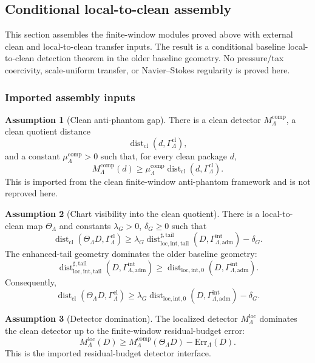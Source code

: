 \documentclass[11pt]{article}
\numberwithin{equation}{section}
\theoremstyle{definition}
\newtheorem{assumption}[assumption]{Assumption}
\theoremstyle{remark}
\newcommand{\loc}{\mathrm{loc}}
\newcommand{\intg}{\mathrm{int}}
\newcommand{\tail}{\mathrm{tail}}
\newcommand{\adm}{\mathrm{adm}}
\newcommand{\cl}{\mathrm{cl}}
\newcommand{\Dist}{\operatorname{dist}}
\newcommand{\Gammaadm}{\Gamma^{\intg}_{\Lambda,\adm}}
\begin{document}
\subsection{Conditional local-to-clean assembly}
\label{sec:conditional-assembly}

This section assembles the finite-window modules proved above with external clean and local-to-clean transfer inputs.  The result is a conditional
baseline local-to-clean detection theorem in the older baseline geometry.  No
pressure/tax coercivity, scale-uniform transfer, or Navier--Stokes regularity
is proved here.

\subsubsection{Imported assembly inputs}

\begin{assumption}[Clean anti-phantom gap]
\label{ass:clean-antiphantom-gap}
There is a clean detector \(M^{\mathrm{comp}}_\Lambda\), a clean quotient
distance
\[
    \operatorname{dist}_{\cl}(d,\Gamma^{\cl}_\Lambda),
\]
and a constant \(\mu^{\mathrm{comp}}_\Lambda>0\) such that, for every clean
package \(d\),
\[
    M^{\mathrm{comp}}_\Lambda(d)
    \ge
    \mu^{\mathrm{comp}}_\Lambda
    \operatorname{dist}_{\cl}(d,\Gamma^{\cl}_\Lambda).
\]
This is imported from the clean finite-window anti-phantom framework and is
not reproved here.
\end{assumption}

\begin{assumption}[Chart visibility into the clean quotient]
\label{ass:chart-visibility-clean}
There is a local-to-clean map \(\Theta_\Lambda\) and constants
\(\lambda_G>0\), \(\delta_G\ge0\) such that
\[
    \operatorname{dist}_{\cl}
    (\Theta_\Lambda D,\Gamma^{\cl}_\Lambda)
    \ge
    \lambda_G
    \Dist^{\sharp,\tail}_{\loc,\intg,\tail}(D,\Gammaadm)
    -
    \delta_G .
\]
The enhanced-tail geometry dominates the older baseline geometry:
\[
    \Dist^{\sharp,\tail}_{\loc,\intg,\tail}(D,\Gammaadm)
    \ge
    \Dist_{\loc,\intg,0}(D,\Gammaadm).
\]
Consequently,
\[
    \operatorname{dist}_{\cl}
    (\Theta_\Lambda D,\Gamma^{\cl}_\Lambda)
    \ge
    \lambda_G
    \Dist_{\loc,\intg,0}(D,\Gammaadm)
    -
    \delta_G .
\]
\end{assumption}

\begin{assumption}[Detector domination]
\label{ass:detector-domination}
The localized detector \(M^{\loc}_\Lambda\) dominates the clean detector up
to the finite-window residual-budget error:
\[
    M^{\loc}_\Lambda(D)
    \ge
    M^{\mathrm{comp}}_\Lambda(\Theta_\Lambda D)
    -
    \mathrm{Err}_\Lambda(D).
\]
This is the imported residual-budget detector interface.
\end{assumption}
\end{document}
